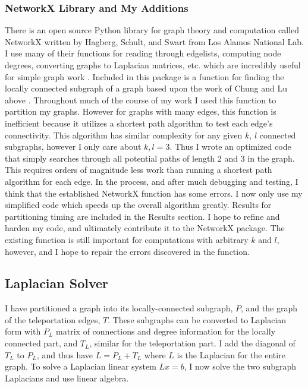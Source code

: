 \documentclass{article}
\begin{document}
\subsubsection{NetworkX Library and My Additions}
There is an open source Python library for graph theory and computation called NetworkX written by Hagberg, Schult, and Swart from Los Alamos National Lab. I use many of their functions for reading through edgelists, computing node degrees, converting graphs to Laplacian matrices, etc. which are incredibly useful for simple graph work \cite{Hagberg:2008}. Included in this package is a function for finding the locally connected subgraph of a graph based upon the work of Chung and Lu above \cite{Chung:2004}. Throughout much of the course of my work I used this function to partition my graphs. However for graphs with many edges, this function is inefficient because it utilizes a shortest path algorithm \cite{Dijkstra:1959} to test each edge's connectivity. This algorithm has similar complexity for any given $k$, $l$ connected subgraphs, however I only care about $k,l = 3$. Thus I wrote an optimized code that simply searches through all potential paths of length 2 and 3 in the graph. This requires orders of magnitude less work than running a shortest path algorithm for each edge. In the process, and after much debugging and testing, I think that the established NetworkX function has some errors. I now only use my simplified code which speeds up the overall algorithm greatly. Results for partitioning timing are included in the Results section. I hope to refine and harden my code, and ultimately contribute it to the NetworkX package. The existing function is still important for computations with arbitrary $k$ and $l$, however, and I hope to repair the errors discovered in the function.

\subsection{Laplacian Solver}
I have partitioned a graph into its locally-connected subgraph, $P$, and the graph of the teleportation edges, $T$. These subgraphs can be converted to Laplacian form with $P_L$ matrix of connections and degree information for the locally connected part, and $T_L$, similar for the teleportation part. I add the diagonal of $T_L$ to $P_L$, and thus have $L = P_L + T_L$ where $L$ is the Laplacian for the entire graph. To solve a Laplacian linear system $Lx=b$, I now solve the two subgraph Laplacians and use linear algebra.
\end{document}
